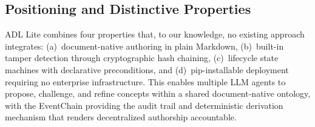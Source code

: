 \subsection{Positioning and Distinctive Properties}\label{subsec:positioning}

ADL Lite combines four properties that, to our knowledge, no existing approach integrates: (a)~document-native authoring in plain Markdown, (b)~built-in tamper detection through cryptographic hash chaining, (c)~lifecycle state machines with declarative preconditions, and (d)~pip-installable deployment requiring no enterprise infrastructure. This enables multiple LLM agents to propose, challenge, and refine concepts within a shared document-native ontology, with the EventChain providing the audit trail and deterministic derivation mechanism that renders decentralized authorship accountable.
